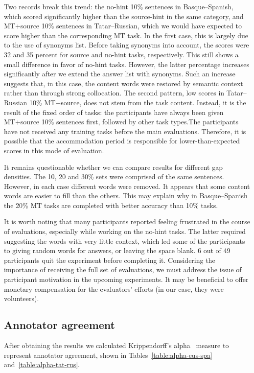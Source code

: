 \documentclass[11pt]{article}
\newcommand{\comment}[1]{}
\begin{document}
Two records break this trend: the no-hint 10\% sentences in Basque--Spanish, which scored significantly higher than the source-hint in the same category, and MT+source 10\% sentences in Tatar--Russian, which we would have expected to score higher than the corresponding MT task. In the first case, this is largely due to the use of synonyms list. Before taking synonyms into account, the scores were 32 and 35 percent for source and no-hint tasks, respectively. This still shows a small difference in favor of no-hint tasks. However, the latter percentage increases significantly after we extend the answer list with synonyms. Such an increase suggests that, in this case, the content words were restored by 
semantic context rather than through strong collocation. The second pattern, low scores in Tatar--Russian 10\% MT+source, does not stem from the task content. Instead, it is the result of the fixed order of tasks: the participants have always been given MT+source 10\% sentences first, followed by other task types.\comment{MLF: Why? Not random? \cite{oregan13} did random! Why was this changed?}The participants have not received any training tasks before the main evaluations. Therefore, it is possible that the accommodation period is responsible for lower-than-expected scores in this mode of evaluation. 

It remains questionable whether we can compare results for different gap densities. The 10, 20 and 30\% sets were comprised
of the same sentences. However, in each case different words were removed. It appears
that some content words are easier to fill than the others. This may explain why in
Basque--Spanish the 20\% MT tasks are completed with better accuracy than 10\% tasks.\comment{MLF: I think this shows that our statistics are weak, should we say something to excuse ourselves?}

It is worth noting that many participants reported feeling frustrated in
the course of evaluations, especially while working on the no-hint tasks. The latter required suggesting the words with very little context, which led some of the participants to giving random words for answers, or leaving the space blank. 6 out of 49
participants quit the experiment before completing it. Considering the importance of receiving the full set of evaluations, we must address the issue of participant motivation in the upcoming experiments. It may be beneficial to offer monetary compensation for the evaluators' efforts (in our case, they were volunteers).

\subsection{Annotator agreement}
After obtaining the results we calculated Krippendorff's alpha~\citep{krippendorff70} measure to represent annotator agreement, shown in Tables~\ref{table:alpha-eus-spa} and~\ref{table:alpha-tat-rus}. 
\end{document}
